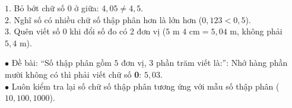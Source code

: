 \documentclass[14pt,a4paper,oneside]{extbook}
\begin{document}
\noindent
\begin{minipage}[t]{0.54\textwidth}
  \begin{tcolorbox}[
    enhanced,
    title={\footnotesize\bfseries\color{white}\faBullhorn\ 3 sai lầm học sinh hay mắc nhất},
    colback=green!3!white,
    colframe=green!60!black,
    arc=2.5mm, boxrule=0.8pt, top=1.8mm, bottom=1.8mm, left=2.2mm, right=2.2mm
  ]
    \footnotesize
    $1.$ Bỏ bớt chữ số $0$ ở giữa: $4,05 \neq 4,5$.\\
    $2.$ Nghĩ số có nhiều chữ số thập phân hơn là lớn hơn ($0,123 < 0,5$).\\
    $3.$ Quên viết số $0$ khi đổi số đo có 2 đơn vị ($5\text{ m } 4\text{ cm} = 5,04\text{ m}$, không phải $5,4\text{ m}$).
  \end{tcolorbox}
\end{minipage}%
\hfill
\begin{minipage}[t]{0.44\textwidth}
  \begin{tcolorbox}[
    enhanced,
    title={\footnotesize\bfseries\color{white}\faExclamationTriangle\ Mẹo tránh bẫy trắc nghiệm},
    colback=red!2!white,
    colframe=red!70!black,
    arc=2.5mm, boxrule=0.8pt, top=1.8mm, bottom=1.8mm, left=2.2mm, right=2.2mm
  ]
    \footnotesize
    $\bullet$ Đề bài: ``Số thập phân gồm $5$ đơn vị, $3$ phần trăm viết là:'': Nhớ hàng phần mười không có thì phải viết chữ số \textbf{0}: $5,03$.\\
    $\bullet$ Luôn kiểm tra lại số chữ số thập phân tương ứng với mẫu số thập phân ($10, 100, 1000$).
  \end{tcolorbox}
\end{minipage}
\end{document}
